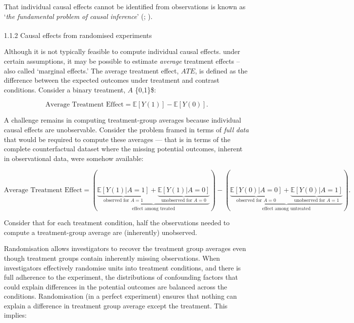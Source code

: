\documentclass[
  singlecolumn]{article}
\makeatletter
\let\oldparagraph\paragraph
\renewcommand{\paragraph}{
    \@ifstar
      \xxxParagraphStar
      \xxxParagraphNoStar
  }
\newcommand{\xxxParagraphStar}[1]{\oldparagraph*{#1}\mbox{}}
\newcommand{\xxxParagraphNoStar}[1]{\oldparagraph{#1}\mbox{}}
\makeatother
\begin{document}
That individual causal effects cannot be identified from observations is
known as `\emph{the fundamental problem of causal inference}'
(;
).

\paragraph{1.1.2 Causal effects from randomised
experiments}\label{causal-effects-from-randomised-experiments}

Although it is not typically feasible to compute individual causal
effects. under certain assumptions, it may be possible to estimate
\emph{average} treatment effects -- also called `marginal effects.' The
average treatment effect, \(ATE\), is defined as the difference between
the expected outcomes under treatment and contrast conditions. Consider
a binary treatment, \(A\) \in \{0,1\}\$:

\[
\text{Average Treatment Effect}  = \mathbb{E}[Y(1)] - \mathbb{E}[Y(0)].
\]

A challenge remains in computing treatment-group averages because
individual causal effects are unobservable. Consider the problem framed
in terms of \emph{full data} that would be required to compute these
averages --- that is in terms of the complete counterfactual dataset
where the missing potential outcomes, inherent in observational data,
were somehow available:

\[
\text{Average Treatment Effect} = \left(\underbrace{\underbrace{\mathbb{E}[Y(1)|A = 1]}_{\text{observed for } A = 1} + \underbrace{\mathbb{E}[Y(1)|A = 0]}_{\text{unobserved for } A = 0}}_{\text{effect among treated}}\right) - \left(\underbrace{\underbrace{\mathbb{E}[Y(0)|A = 0]}_{\text{observed for } A = 0} + \underbrace{\mathbb{E}[Y(0)|A = 1]}_{\text{unobserved for } A = 1}}_{\text{effect among untreated}}\right).
\]

Consider that for each treatment condition, half the observations needed
to compute a treatment-group average are (inherently) unobserved.

Randomisation allows investigators to recover the treatment group
averages even though treatment groups contain inherently missing
observations. When investigators effectively randomise units into
treatment conditions, and there is full adherence to the experiment, the
distributions of confounding factors that could explain differences in
the potential outcomes are balanced across the conditions. Randomisation
(in a perfect experiment) ensures that nothing can explain a difference
in treatment group average except the treatment. This implies:
\end{document}
